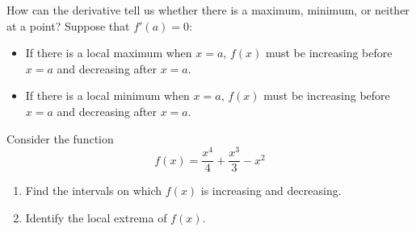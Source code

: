 How can the derivative tell us whether there is a maximum, minimum, or
neither at a point? Suppose that $f'(a)=0$:
\begin{itemize}
\item If there is a local maximum when $x=a$, $f(x)$ must be
  increasing before $x=a$ and decreasing after $x=a$.
\item If there is a local minimum when $x=a$, $f(x)$ must be
  increasing before $x=a$ and decreasing after $x=a$.
\end{itemize}

\begin{example}
Consider the function 
\[
f(x) = \frac{x^4}{4}+\frac{x^3}{3}-x^2
\]
\begin{enumerate}
\item Find the intervals on which $f(x)$ is increasing and decreasing.
\item Identify the local extrema of $f(x)$. 
\end{enumerate}
\end{example}


